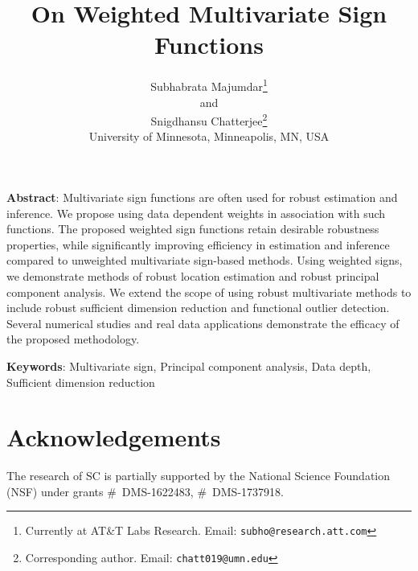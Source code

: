 \documentclass[11pt,letterpaper]{article}
\theoremstyle{definition} \newtheorem{Definition}[Theorem]{Definition}
\begin{document}
\title{On Weighted Multivariate Sign Functions}
\date{}
\author{
Subhabrata Majumdar\thanks{Currently at AT\&T Labs Research. Email: {\tt subho@research.att.com}}\\
and\\
Snigdhansu Chatterjee\thanks{Corresponding author. Email: {\tt chatt019@umn.edu}}\\
	University of Minnesota, Minneapolis, MN, USA
}
\maketitle

\noindent\textbf{Abstract}: 
Multivariate sign functions are often used for robust estimation and inference. We propose using data dependent weights in association with such functions. The proposed weighted sign functions  retain desirable robustness properties, while significantly improving efficiency in estimation and inference compared to unweighted multivariate sign-based methods. Using weighted signs, we demonstrate methods of robust location estimation and robust principal component analysis. We extend the scope of using robust multivariate methods to include robust sufficient dimension reduction and functional outlier detection. Several numerical studies and real data applications demonstrate the efficacy of the proposed methodology.

\vspace{.5cm}
\noindent\textbf{Keywords}: Multivariate sign, Principal component analysis, Data depth, Sufficient dimension reduction










\section*{Acknowledgements}
The research of SC is partially  supported by the National Science Foundation (NSF) under grants \#~DMS-1622483, \#~DMS-1737918.


%


\end{document}
